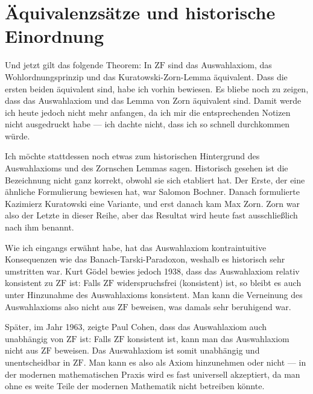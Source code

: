 \section{Äquivalenzsätze und historische Einordnung}

\begin{spoken-clean}[01:14:54 - 01:22:06]
Und jetzt gilt das folgende Theorem: In $\text{ZF}$ sind das Auswahlaxiom, das Wohlordnungsprinzip und das Kuratowski-Zorn-Lemma äquivalent. Dass die ersten beiden äquivalent sind, habe ich vorhin bewiesen. Es bliebe noch zu zeigen, dass das Auswahlaxiom und das Lemma von Zorn äquivalent sind. Damit werde ich heute jedoch nicht mehr anfangen, da ich mir die entsprechenden Notizen nicht ausgedruckt habe --- ich dachte nicht, dass ich so schnell durchkommen würde.

Ich möchte stattdessen noch etwas zum historischen Hintergrund des Auswahlaxioms und des Zornschen Lemmas sagen. Historisch gesehen ist die Bezeichnung  nicht ganz korrekt, obwohl sie sich etabliert hat. Der Erste, der eine ähnliche Formulierung bewiesen hat, war Salomon Bochner. Danach formulierte Kazimierz Kuratowski eine Variante, und erst danach kam Max Zorn. Zorn war also der Letzte in dieser Reihe, aber das Resultat wird heute fast ausschließlich nach ihm benannt.

Wie ich eingangs erwähnt habe, hat das Auswahlaxiom kontraintuitive Konsequenzen wie das Banach-Tarski-Paradoxon, weshalb es historisch sehr umstritten war. Kurt Gödel bewies jedoch 1938, dass das Auswahlaxiom relativ konsistent zu $\text{ZF}$ ist: Falls $\text{ZF}$ widerspruchsfrei (konsistent) ist, so bleibt es auch unter Hinzunahme des Auswahlaxioms konsistent. Man kann die Verneinung des Auswahlaxioms also nicht aus $\text{ZF}$ beweisen, was damals sehr beruhigend war.

Später, im Jahr 1963, zeigte Paul Cohen, dass das Auswahlaxiom auch unabhängig von $\text{ZF}$ ist: Falls $\text{ZF}$ konsistent ist, kann man das Auswahlaxiom nicht aus $\text{ZF}$ beweisen. Das Auswahlaxiom ist somit unabhängig und unentscheidbar in $\text{ZF}$. Man kann es also als Axiom hinzunehmen oder nicht --- in der modernen mathematischen Praxis wird es fast universell akzeptiert, da man ohne es weite Teile der modernen Mathematik nicht betreiben könnte.
\end{spoken-clean}

\begin{math-stroke}
\end{math-stroke}

